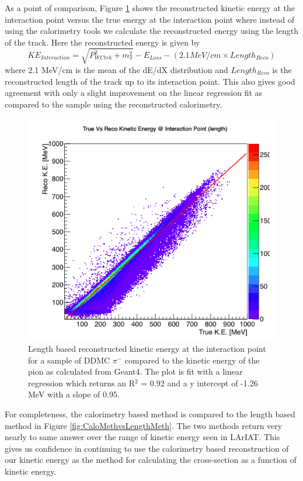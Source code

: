 As a point of comparison, Figure \ref{fig:LengthRecoEvsTrueE} shows the reconstructed kinetic energy at the interaction point versus the true energy at the interaction point where instead of using the calorimetry tools we calculate the reconstructed energy using the length of the track. Here the reconstructed energy is given by 
\begin{equation}
KE_{Interaction} = \sqrt{P_{WCtrk}^2 + m_{\pi}^2} - E_{Loss} - (2.1 MeV/cm \times Length_{Reco})
\end{equation}
where 2.1 MeV/cm is the mean of the dE/dX distribution and $Length_{Reco}$ is the reconstructed length of the track up to its interaction point. This also gives good agreement with only a slight improvement on the linear regression fit as compared to the sample using the reconstructed calorimetry.
 
\begin{figure}[htb]
\centering
\includegraphics[scale=0.38]{./images/LengthRecoEvsTrueE.png}
\caption{Length based reconstructed kinetic energy at the interaction point for a sample of DDMC $\pi^{-}$ compared to the kinetic energy of the pion as calculated from Geant4. The plot is fit with a linear regression which returns an R$^{2}$ = 0.92 and a y intercept of -1.26 MeV with a slope of 0.95.}
\label{fig:LengthRecoEvsTrueE}
\end{figure}

For completeness, the calorimetry based method is compared to the length based method in Figure \ref{fig:CaloMethvsLengthMeth}. The two methods return very nearly to same answer over the range of kinetic energy seen in LArIAT. This gives us confidence in continuing to use the calorimetry based reconstruction of our kinetic energy as the method for calculating the cross-section as a function of kinetic energy.

